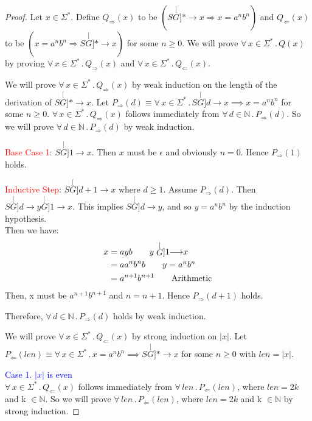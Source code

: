 \documentclass[11pt,fleqn]{article}
\newcommand{\ForallApp}{\forall\,}
\newcommand{\mdot}{\mathrel.}
\newcommand{\der}[2]{\stackrel[#2]{#1}{\longrightarrow}}
\begin{document}
\begin{proof}
Let $x \in \Sigma^*$.  
Define $Q_{\Rightarrow}(x)$ to be $(S \der{*}{G} x \Rightarrow x = a^nb^n)$ and 
$Q_{\Leftarrow}(x)$ to be $(x = a^nb^n \Rightarrow S \der{*}{G} x)$ for some $n \ge 0$.  
We will prove $\ForallApp x \in \Sigma^* \mdot Q(x)$ by proving $\ForallApp x \in \Sigma^* \mdot
Q_{\Rightarrow}(x)$ and $\ForallApp x \in \Sigma^* \mdot
Q_{\Leftarrow}(x)$.

\medskip

We will prove $\ForallApp x \in \Sigma^* \mdot Q_{\Rightarrow}(x)$ by
weak induction on the length of the derivation of $S \der{*}{G} x$.
Let $P_{\Rightarrow}(d) \equiv \ForallApp x \in \Sigma^* \mdot S \der{d}{G} x \implies x = a^nb^n$ for some $n \ge 0$.  $\ForallApp x \in \Sigma^*
\mdot Q_{\Rightarrow}(x)$ follows immediately from $\ForallApp d \in
\mathbb{N} \mdot P_{\Rightarrow}(d)$.  So we will prove $\ForallApp d
\in \mathbb{N} \mdot P_{\Rightarrow}(d)$ by weak induction.

\textcolor{red}{Base Case 1}: $S \der{1}{G} x$.  Then $x$ must be $\epsilon$ and obviously $n = 0$.  Hence
$P_{\Rightarrow}(1)$ holds.

\textcolor{red}{Inductive Step}: $S \der{d+1}{G} x$ where $d \ge 1$.  Assume
$P_{\Rightarrow}(d)$.  Then $S \der{d}{G} y \der{1}{G} x$.
This implies $S \der{d}{G} y$, and so $y = a^nb^n$ by the induction hypothesis. \\
Then we have:
\begin{align}
x &= ayb \tag*{$y \der{1}{G} x$} \\
  &= aa^nb^nb \tag*{$y = a^nb^n$} \\
  &= a^{n+1}b^{n+1} \tag*{Arithmetic} \\
\end{align}
Then, x must be $a^{n+1}b^{n+1}$ and $n = n + 1$.
Hence \mbox{$P_{\Rightarrow}(d+1)$} holds.

Therefore, $\ForallApp d \in \mathbb{N} \mdot P_{\Rightarrow}(d)$
holds by weak induction.

\medskip

We will prove $\ForallApp x \in \Sigma^* \mdot Q_{\Leftarrow}(x)$ by
strong induction on $|x|$.  
Let $P_{\Leftarrow}(len) \equiv \ForallApp x \in \Sigma^* \mdot x = a^nb^n \implies S \der{*}{G} x$
for some $n \ge 0$ with $len = |x|$. 

\textcolor{blue}{Case 1. $|x|$ is even }\\

$\ForallApp x \in \Sigma^* \mdot Q_{\Leftarrow}(x)$ 
follows immediately from $\ForallApp len \mdot P_{\Leftarrow}(len)$, 
where $len = 2k$ and k $\in \mathbb{N}$. 
So we will prove $\ForallApp len \mdot P_{\Leftarrow}(len)$, where $len = 2k$ and k $\in \mathbb{N}$ by strong induction.


\end{proof}
\end{document}
